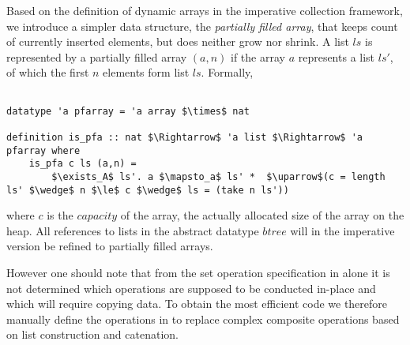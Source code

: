 Based on the definition of dynamic arrays in the 
imperative collection framework,
we introduce a simpler data structure,
the \textit{partially filled array},
that keeps count of currently inserted elements,
but does neither grow nor shrink.
A list $ls$ is represented by a partially filled array $(a,n)$
if the array $a$ represents a list $ls'$, of which the first $n$
elements form list $ls$.
Formally,

\begin{lstlisting}[mathescape=true, language=Isabelle]

datatype 'a pfarray = 'a array $\times$ nat

definition is_pfa :: nat $\Rightarrow$ 'a list $\Rightarrow$ 'a pfarray where
    is_pfa c ls (a,n) =
        $\exists_A$ ls'. a $\mapsto_a$ ls' *  $\uparrow$(c = length ls' $\wedge$ n $\le$ c $\wedge$ ls = (take n ls'))
\end{lstlisting}

where $c$ is the $capacity$ of the array,
the actually allocated size of the array on the heap.
All references to lists in the abstract datatype $btree$
will in the imperative version be refined to partially filled arrays.

However one should note that
from the set operation specification in  alone
it is not determined which operations are supposed to be conducted
in-place and which will require copying data.
To obtain the most efficient code we therefore manually
define the operations in  to replace complex composite
operations based on list construction and catenation.

